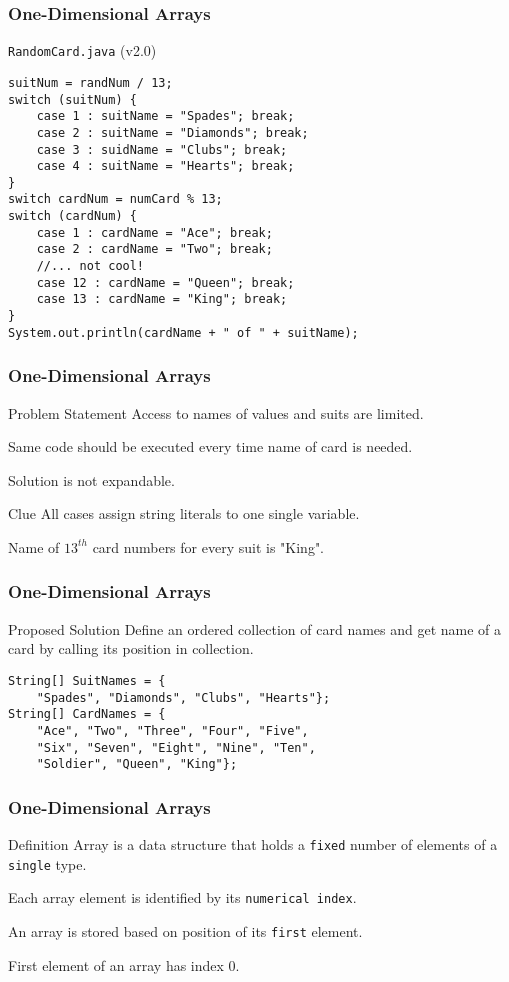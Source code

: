 \documentclass[10pt, compress]{beamer}
\begin{document}
\begin{frame}[fragile]
	\frametitle{One-Dimensional Arrays}
	\begin{block}{\texttt{RandomCard.java} (v2.0)}
		\begin{verbatim}
suitNum = randNum / 13;
switch (suitNum) {
	case 1 : suitName = "Spades"; break;
	case 2 : suitName = "Diamonds"; break;
	case 3 : suidName = "Clubs"; break;
	case 4 : suitName = "Hearts"; break;
}
switch cardNum = numCard % 13;
switch (cardNum) {
	case 1 : cardName = "Ace"; break;
	case 2 : cardName = "Two"; break;
	//... not cool!
	case 12 : cardName = "Queen"; break;
	case 13 : cardName = "King"; break;
}
System.out.println(cardName + " of " + suitName);
		\end{verbatim}
	\end{block}
\end{frame}

\begin{frame}[fragile]
	\frametitle{One-Dimensional Arrays}
	\begin{block}{Problem Statement}
		Access to names of values and suits are limited.

		Same code should be executed every time name of card is needed.

		Solution is not expandable.
	\end{block}
	\begin{block}{Clue}
		All cases assign string literals to one single variable.

		Name of $13^{th}$ card numbers for every suit is "King".
	\end{block}
\end{frame}

\begin{frame}[fragile]
	\frametitle{One-Dimensional Arrays}
	\begin{block}{Proposed Solution}
		Define an ordered collection of card names and get name of a card by calling its position in collection.
		\begin{verbatim}
String[] SuitNames = {
	"Spades", "Diamonds", "Clubs", "Hearts"};
String[] CardNames = {
	"Ace", "Two", "Three", "Four", "Five",
	"Six", "Seven", "Eight", "Nine", "Ten",
	"Soldier", "Queen", "King"};
		\end{verbatim}
	\end{block}
\end{frame}

\begin{frame}[fragile]
	\frametitle{One-Dimensional Arrays}
	\begin{block}{Definition}
		Array is a data structure that holds a \texttt{fixed} number of elements of a \texttt{single} type.

		Each array element is identified by its \texttt{numerical index}.

		An array is stored based on position of its \texttt{first} element.

		First element of an array has index 0.
	\end{block}
\end{frame}
\end{document}
